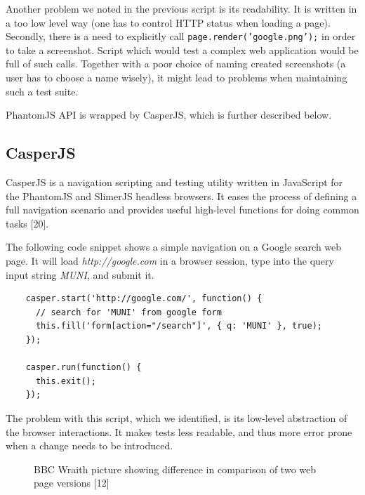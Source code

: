 \documentclass[11pt,oneside,final]{fithesis2}
\begin{document}
    Another problem we noted in the previous script is its readability. It is written in a too low level way (one has to control HTTP status when loading a page). Secondly, there is a need
    to explicitly call \texttt{page.render('google.png');} in order to take a screenshot. Script which would test a complex web application would be full of such calls. Together with a poor
    choice of naming created screenshots (a user has to choose a name wisely), it might lead to problems when maintaining such a test suite.
    
    PhantomJS API is wrapped by CasperJS, which is further described below.
    
    \subsection{CasperJS}
    \label{subsec:casperJS}
    CasperJS is a navigation scripting and testing utility written in JavaScript for the PhantomJS and SlimerJS headless browsers. It eases the process of defining a full navigation scenario 
    and provides useful high-level functions for doing common tasks [20].
    
    The following code snippet shows a simple navigation on a Google search web page. It will load \textit{http://google.com} in a browser session, 
    type into the query input string \textit{MUNI}, and submit it.
    
    \begin{verbatim}
    casper.start('http://google.com/', function() {
      // search for 'MUNI' from google form
      this.fill('form[action="/search"]', { q: 'MUNI' }, true);
    });
   
    casper.run(function() {
      this.exit();
    });
    \end{verbatim}
    
    The problem with this script, which we identified, is its low-level abstraction of the browser interactions. It makes tests less readable, and thus more error prone when a change
    needs to be introduced.
    
    \begin{figure}[!htb]
    \begin{center}
    \leavevmode
    \centerline{}
    \end{center}
    \caption{BBC Wraith picture showing difference in comparison of two web page versions [12]}
    \label{fig:bbcWraithDiff} 
  \end{figure}
\end{document}
